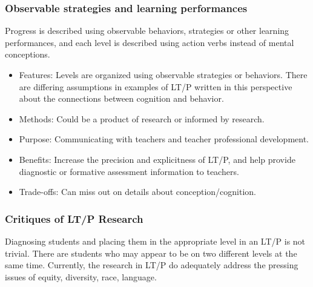 \documentclass{TC}
\begin{document}
 
\subsubsection{Observable strategies and learning performances}
 
  Progress is described using observable behaviors, strategies or other learning performances, and each level is described using action verbs instead of mental conceptions.
  
\begin{multicols}{2}
\begin{itemize}
\item Features: Levels are organized using observable strategies or behaviors. There are differing assumptions in examples of LT/P written in this perspective about the connections between cognition and behavior.
\item Methods: Could be a product of research or informed by research.
\item Purpose: Communicating with teachers and teacher professional development. 
\item Benefits: Increase the precision and explicitness of LT/P, and help provide diagnostic or formative assessment information to teachers.
\item Trade-offs: Can miss out on details about conception/cognition. 
 \end{itemize}
 \end{multicols}
 
\subsubsection{Critiques of LT/P Research}

Diagnosing students and placing them in the appropriate level in an LT/P is not trivial. There are students who may appear to be on two different levels at the same time. Currently, the research in LT/P do adequately address the pressing issues of equity, diversity, race, language.
\end{document}
